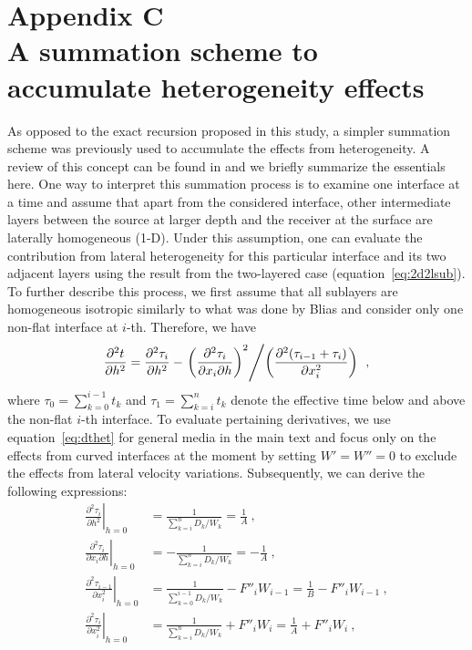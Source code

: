 \section{Appendix C \\ A summation scheme to accumulate heterogeneity effects}
\label{sec:appc}
As opposed to the exact recursion proposed in this study, a simpler summation scheme was previously used to accumulate the effects from heterogeneity. A review of this concept can be found in \cite{blias2006} and we briefly summarize the essentials here. One way to interpret this summation process is to examine one interface at a time and assume that apart from the considered interface, other intermediate layers between the source at larger depth and the receiver at the surface are laterally homogeneous (1-D). Under this assumption, one can evaluate the contribution from lateral heterogeneity for this particular interface and its two adjacent layers using the result from the two-layered case (equation~\ref{eq:2d2lsub}). To further describe this process, we first assume that all sublayers are homogeneous isotropic similarly to what was done by Blias and consider only one non-flat interface at $i$-th. Therefore, we have
\begin{equation}
\label{eq:bliassimp}
\frac{\partial^2 t}{\partial h^2} = \frac{\partial^2 \tau_i}{\partial h^2} - \left. \left(\frac{\partial^2 \tau_i }{ \partial x_i \partial h}\right)^2 \middle/ \left(\frac{\partial^2 (\tau_{i-1}+\tau_i) }{ \partial x_i^2} \right) \right. ~,
\end{equation}
where $\tau_0 = \sum^{i-1}_{k=0} t_k$ and $\tau_1 = \sum^n_{k=i} t_k$ denote the effective time below and above the non-flat $i$-th interface. To evaluate pertaining derivatives, we use equation~\ref{eq:dthet} for general media in the main text and focus only on the effects from curved interfaces at the moment by setting $W' = W'' = 0$ to exclude the effects from lateral velocity variations. Subsequently, we can derive the following expressions:
\begin{align}
\label{eq:hetiso}
\left. \frac{\partial^2 \tau_i }{\partial h^2} \right\rvert_{h=0} & = \frac{1}{\sum^n_{k=i} D_k/W_k} = \frac{1}{A}~,\\
\nonumber
\left. \frac{\partial^2 \tau_i }{ \partial x_i \partial h} \right\rvert_{h=0} & =  -\frac{1}{\sum^n_{k=i} D_k/W_k} = -\frac{1}{A} ~,\\
\nonumber
\left. \frac{\partial^2 \tau_{i-1} }{ \partial x_i^2} \right\rvert_{h=0} & =  \frac{1}{\sum^{i-1}_{k=0} D_k/W_k}- F''_iW_{i-1} = \frac{1}{B} - F''_iW_{i-1}  ~,\\
\nonumber
\left. \frac{\partial^2 \tau_i }{ \partial x_i^2} \right\rvert_{h=0} & =  \frac{1}{\sum^n_{k=i} D_k/W_k}+ F''_iW_i = \frac{1}{A} + F''_iW_i~,
\end{align}
